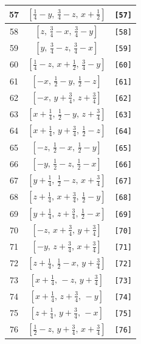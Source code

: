 \documentclass[fleqn,8pt]{jsarticle}
\begin{document}
\begin{longtable}{ccc}
57 & $\left[ \frac{1}{4} - y,\, \frac{3}{4} - z,\, x + \frac{1}{2} \right]$ & {\tt [57]} \\ \hline
58 & $\left[ z,\, \frac{3}{4} - x,\, \frac{3}{4} - y \right]$ & {\tt [58]} \\ \hline
59 & $\left[ y,\, \frac{3}{4} - z,\, \frac{3}{4} - x \right]$ & {\tt [59]} \\ \hline
60 & $\left[ \frac{1}{4} - z,\, x + \frac{1}{2},\, \frac{3}{4} - y \right]$ & {\tt [60]} \\ \hline
61 & $\left[ - x,\, \frac{1}{2} - y,\, \frac{1}{2} - z \right]$ & {\tt [61]} \\ \hline
62 & $\left[ - x,\, y + \frac{3}{4},\, z + \frac{3}{4} \right]$ & {\tt [62]} \\ \hline
63 & $\left[ x + \frac{1}{4},\, \frac{1}{2} - y,\, z + \frac{3}{4} \right]$ & {\tt [63]} \\ \hline
64 & $\left[ x + \frac{1}{4},\, y + \frac{3}{4},\, \frac{1}{2} - z \right]$ & {\tt [64]} \\ \hline
65 & $\left[ - z,\, \frac{1}{2} - x,\, \frac{1}{2} - y \right]$ & {\tt [65]} \\ \hline
66 & $\left[ - y,\, \frac{1}{2} - z,\, \frac{1}{2} - x \right]$ & {\tt [66]} \\ \hline
67 & $\left[ y + \frac{1}{4},\, \frac{1}{2} - z,\, x + \frac{3}{4} \right]$ & {\tt [67]} \\ \hline
68 & $\left[ z + \frac{1}{4},\, x + \frac{3}{4},\, \frac{1}{2} - y \right]$ & {\tt [68]} \\ \hline
69 & $\left[ y + \frac{1}{4},\, z + \frac{3}{4},\, \frac{1}{2} - x \right]$ & {\tt [69]} \\ \hline
70 & $\left[ - z,\, x + \frac{3}{4},\, y + \frac{3}{4} \right]$ & {\tt [70]} \\ \hline
71 & $\left[ - y,\, z + \frac{3}{4},\, x + \frac{3}{4} \right]$ & {\tt [71]} \\ \hline
72 & $\left[ z + \frac{1}{4},\, \frac{1}{2} - x,\, y + \frac{3}{4} \right]$ & {\tt [72]} \\ \hline
73 & $\left[ x + \frac{1}{4},\, - z,\, y + \frac{3}{4} \right]$ & {\tt [73]} \\ \hline
74 & $\left[ x + \frac{1}{4},\, z + \frac{3}{4},\, - y \right]$ & {\tt [74]} \\ \hline
75 & $\left[ z + \frac{1}{4},\, y + \frac{3}{4},\, - x \right]$ & {\tt [75]} \\ \hline
76 & $\left[ \frac{1}{2} - z,\, y + \frac{3}{4},\, x + \frac{3}{4} \right]$ & {\tt [76]} \\ \hline

\end{longtable}
\end{document}
